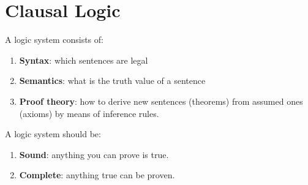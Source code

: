 \section{Clausal Logic}
A logic system consists of:
\begin{enumerate}
\item \textbf{Syntax}: which sentences are legal
\item \textbf{Semantics}: what is the truth value of a sentence
\item \textbf{Proof theory}: how to derive new sentences (theorems) from assumed ones (axioms) by means of inference rules.
\end{enumerate}
A logic system should be:
\begin{enumerate}
\item \textbf{Sound}: anything you can prove is true.
\item \textbf{Complete}: anything true can be proven.
\end{enumerate}

